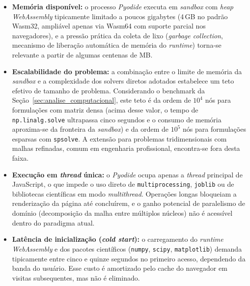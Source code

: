 \begin{itemize}
    \item \textbf{Memória disponível:} o processo \textit{Pyodide} executa em \textit{sandbox} com \textit{heap} \textit{WebAssembly} tipicamente limitado a poucos gigabytes (4\,GB no padrão Wasm32, ampliável apenas via Wasm64 com suporte parcial nos navegadores), e a pressão prática da coleta de lixo (\textit{garbage collection}, mecanismo de liberação automática de memória do \textit{runtime}) torna-se relevante a partir de algumas centenas de MB.

    \item \textbf{Escalabilidade do problema:} a combinação entre o limite de memória da \textit{sandbox} e a complexidade dos solvers diretos adotados estabelece um teto efetivo de tamanho de problema. Considerando o benchmark da Seção~\ref{sec:analise_computacional}, este teto é da ordem de $10^4$ nós para formulações com matriz densa (acima desse valor, o tempo de \texttt{np.linalg.solve} ultrapassa cinco segundos e o consumo de memória aproxima-se da fronteira da \textit{sandbox}) e da ordem de $10^5$ nós para formulações esparsas com \texttt{spsolve}. A extensão para problemas tridimensionais com malhas refinadas, comum em engenharia profissional, encontra-se fora desta faixa.

    \item \textbf{Execução em \textit{thread} única:} o \textit{Pyodide} ocupa apenas a \textit{thread} principal de JavaScript, o que impede o uso direto de \texttt{multiprocessing}, \texttt{joblib} ou de bibliotecas científicas em modo \textit{multithread}. Operações longas bloqueiam a renderização da página até concluírem, e o ganho potencial de paralelismo de domínio (decomposição da malha entre múltiplos núcleos) não é acessível dentro do paradigma atual.

    \item \textbf{Latência de inicialização (\textit{cold start}):} o carregamento do \textit{runtime} \textit{WebAssembly} e dos pacotes científicos (\texttt{numpy}, \texttt{scipy}, \texttt{matplotlib}) demanda tipicamente entre cinco e quinze segundos no primeiro acesso, dependendo da banda do usuário. Esse custo é amortizado pelo cache do navegador em visitas subsequentes, mas não é eliminado.


\end{itemize}
